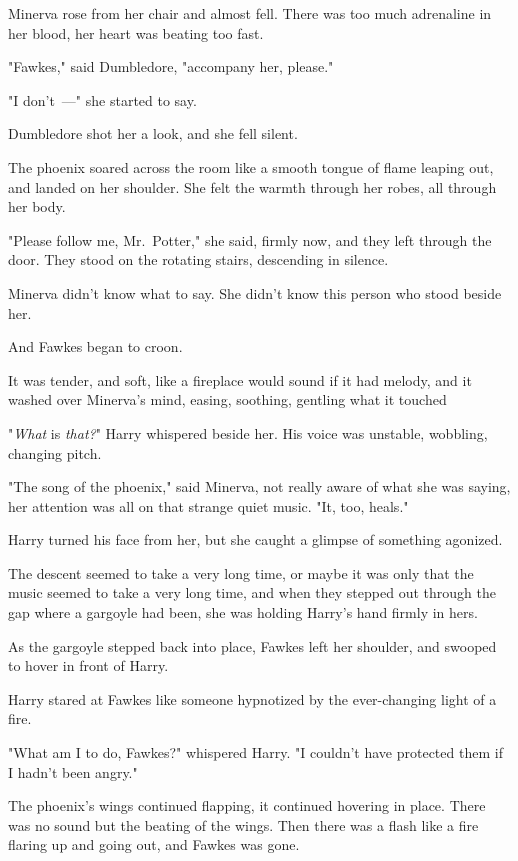 Minerva rose from her chair and almost fell. There was too much adrenaline in
her blood, her heart was beating too fast.

"Fawkes," said Dumbledore, "accompany her, please."

"I don't~---" she started to say.

Dumbledore shot her a look, and she fell silent.

The phoenix soared across the room like a smooth tongue of flame leaping out,
and landed on her shoulder. She felt the warmth through her robes, all through
her body.

"Please follow me, Mr.~Potter," she said, firmly now, and they left through the
door.
\sbreak
They stood on the rotating stairs, descending in silence.

Minerva didn't know what to say. She didn't know this person who stood beside
her.

And Fawkes began to croon.

It was tender, and soft, like a fireplace would sound if it had melody, and it
washed over Minerva's mind, easing, soothing, gentling what it touched{\el}

"\emph{What} is \emph{that?}" Harry whispered beside her. His voice was
unstable, wobbling, changing pitch.

"The song of the phoenix," said Minerva, not really aware of what she was
saying, her attention was all on that strange quiet music. "It, too, heals."

Harry turned his face from her, but she caught a glimpse of something agonized.

The descent seemed to take a very long time, or maybe it was only that the
music seemed to take a very long time, and when they stepped out through the
gap where a gargoyle had been, she was holding Harry's hand firmly in hers.

As the gargoyle stepped back into place, Fawkes left her shoulder, and swooped
to hover in front of Harry.

Harry stared at Fawkes like someone hypnotized by the ever-changing light of a
fire.

"What am I to do, Fawkes?" whispered Harry. "I couldn't have protected them if
I hadn't been angry."

The phoenix's wings continued flapping, it continued hovering in place. There
was no sound but the beating of the wings. Then there was a flash like a fire
flaring up and going out, and Fawkes was gone.

